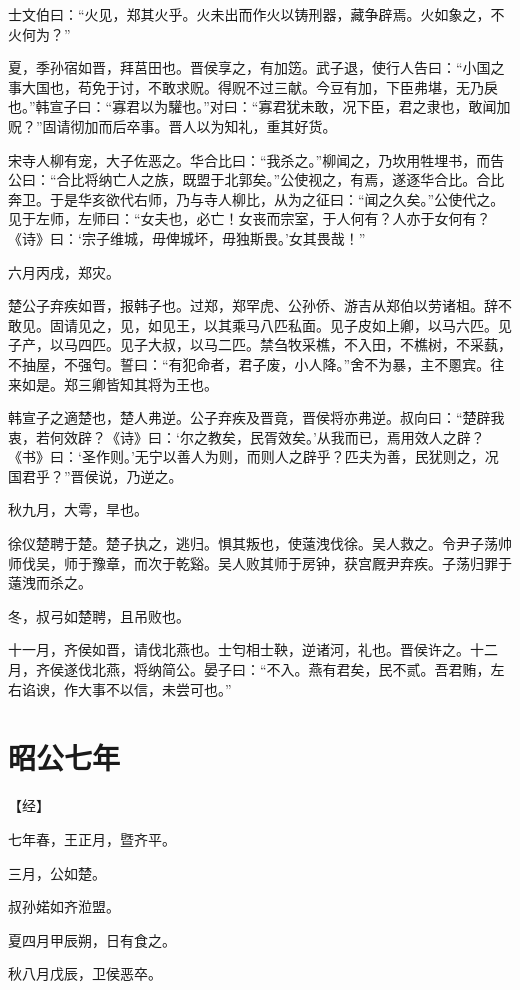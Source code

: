\documentclass[a4paper,12pt,UTF8,twoside]{ctexbook}
\begin{document}
士文伯曰：“火见，郑其火乎。火未出而作火以铸刑器，藏争辟焉。火如象之，不火何为？”

夏，季孙宿如晋，拜莒田也。晋侯享之，有加笾。武子退，使行人告曰：“小国之事大国也，苟免于讨，不敢求贶。得贶不过三献。今豆有加，下臣弗堪，无乃戾也。”韩宣子曰：“寡君以为驩也。”对曰：“寡君犹未敢，况下臣，君之隶也，敢闻加贶？”固请彻加而后卒事。晋人以为知礼，重其好货。

宋寺人柳有宠，大子佐恶之。华合比曰：“我杀之。”柳闻之，乃坎用牲埋书，而告公曰：“合比将纳亡人之族，既盟于北郭矣。”公使视之，有焉，遂逐华合比。合比奔卫。于是华亥欲代右师，乃与寺人柳比，从为之征曰：“闻之久矣。”公使代之。见于左师，左师曰：“女夫也，必亡！女丧而宗室，于人何有？人亦于女何有？《诗》曰：‘宗子维城，毋俾城坏，毋独斯畏。’女其畏哉！”

六月丙戌，郑灾。

楚公子弃疾如晋，报韩子也。过郑，郑罕虎、公孙侨、游吉从郑伯以劳诸柤。辞不敢见。固请见之，见，如见王，以其乘马八匹私面。见子皮如上卿，以马六匹。见子产，以马四匹。见子大叔，以马二匹。禁刍牧采樵，不入田，不樵树，不采蓺，不抽屋，不强匄。誓曰：“有犯命者，君子废，小人降。”舍不为暴，主不慁宾。往来如是。郑三卿皆知其将为王也。

韩宣子之適楚也，楚人弗逆。公子弃疾及晋竟，晋侯将亦弗逆。叔向曰：“楚辟我衷，若何效辟？《诗》曰：‘尔之教矣，民胥效矣。’从我而已，焉用效人之辟？《书》曰：‘圣作则。’无宁以善人为则，而则人之辟乎？匹夫为善，民犹则之，况国君乎？”晋侯说，乃逆之。

秋九月，大雩，旱也。

徐仪楚聘于楚。楚子执之，逃归。惧其叛也，使薳洩伐徐。吴人救之。令尹子荡帅师伐吴，师于豫章，而次于乾谿。吴人败其师于房钟，获宫厩尹弃疾。子荡归罪于薳洩而杀之。

冬，叔弓如楚聘，且吊败也。

十一月，齐侯如晋，请伐北燕也。士匄相士鞅，逆诸河，礼也。晋侯许之。十二月，齐侯遂伐北燕，将纳简公。晏子曰：“不入。燕有君矣，民不贰。吾君贿，左右谄谀，作大事不以信，未尝可也。”


\section{昭公七年}


【经】

七年春，王正月，暨齐平。

三月，公如楚。

叔孙婼如齐涖盟。

夏四月甲辰朔，日有食之。

秋八月戊辰，卫侯恶卒。
\end{document}
